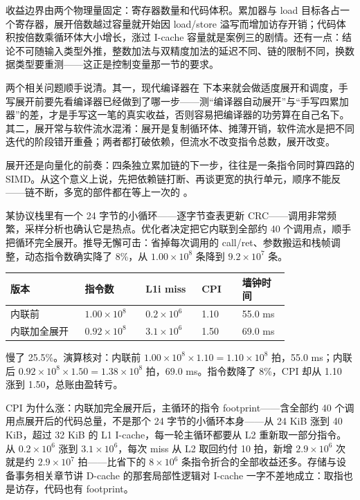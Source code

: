 收益边界由两个物理量固定：寄存器数量和代码体积。累加器与 load 目标各占一个寄存器，展开倍数越过容量就开始因 load/store 溢写而增加访存开销；代码体积按倍数乘循环体大小增长，涨过 I-cache 容量就是案例三的剧情。还有一点：结论不可随输入类型外推，整数加法与双精度加法的延迟不同、链的限制不同，换数据类型要重测——这正是控制变量那一节的要求。

两个相关问题顺手说清。其一，现代编译器在  下本来就会做适度展开和调度，手写展开前要先看编译器已经做到了哪一步——测“编译器自动展开”与“手写四累加器”的差，才是手写这一笔的真实收益，否则容易把编译器的功劳算在自己名下。其二，展开常与软件流水混淆：展开是复制循环体、摊薄开销，软件流水是把不同迭代的阶段错开重叠；两者都打破依赖，但流水不改变指令总数，展开改变。

展开还是向量化的前奏：四条独立累加链的下一步，往往是一条指令同时算四路的 SIMD。从这个意义上说，先把依赖链打断、再谈更宽的执行单元，顺序不能反——链不断，多宽的部件都在等上一次的 。

某协议栈里有一个 24 字节的小循环——逐字节查表更新 CRC——调用非常频繁，采样分析也确认它是热点。优化者决定把它内联到全部约 40 个调用点，顺手把循环完全展开。推导无懈可击：省掉每次调用的 call/ret、参数搬运和栈帧调整，动态指令数确实降了 8\%，从 $1.00\times10^{8}$ 条降到 $9.2\times10^{7}$ 条。

\begin{longtable}{L{0.22\linewidth}L{0.16\linewidth}L{0.16\linewidth}L{0.12\linewidth}L{0.14\linewidth}}
\toprule
版本 & 指令数 & L1i miss & CPI & 墙钟时间 \\
\midrule
内联前 & $1.00\times10^{8}$ & $0.2\times10^{6}$ & 1.10 & 55.0 ms \\\tablerowrule
内联加全展开 & $0.92\times10^{8}$ & $3.1\times10^{6}$ & 1.50 & 69.0 ms \\
\bottomrule
\end{longtable}

慢了 25.5\%。演算核对：内联前 $1.00\times10^{8}\times1.10=1.10\times10^{8}$ 拍，55.0 ms；内联后 $0.92\times10^{8}\times1.50=1.38\times10^{8}$ 拍，69.0 ms。指令数降了 8\%，CPI 却从 1.10 涨到 1.50，总账由盈转亏。

CPI 为什么涨：内联加完全展开后，主循环的指令 footprint——含全部约 40 个调用点展开后的代码总量，不是那个 24 字节的小循环本身——从 24 KiB 涨到 40 KiB，超过 32 KiB 的 L1 I-cache，每一轮主循环都要从 L2 重新取一部分指令。 从 $0.2\times10^{6}$ 涨到 $3.1\times10^{6}$，每次 miss 从 L2 取回约付 10 拍，新增 $2.9\times10^{6}$ 次就是约 $2.9\times10^{7}$ 拍——比省下的 $8\times10^{6}$ 条指令折合的全部收益还多。存储与设备事务相关章节讲 D-cache 的那套局部性逻辑对 I-cache 一字不差地成立：取指也是访存，代码也有 footprint。

